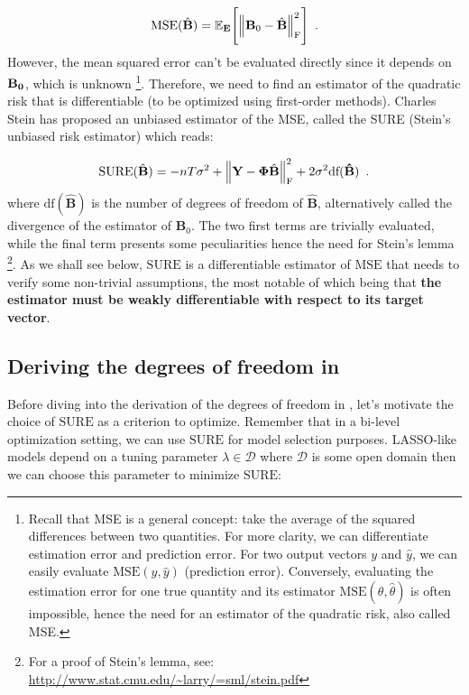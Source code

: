 \documentclass[a4paper,10pt]{article}
\theoremstyle{definition}
\begin{document}
\begin{equation*}
    \text{MSE}(\hat{\mathbf{B}}) = \mathbb{E}_{\mathbf{E}}\Biggl[ \left \lVert \mathbf{B}_0 - \hat{\mathbf{B}} \right \rVert_{\text{F}}^2 \Biggr]
    \enspace .
\end{equation*}
%
However, the mean squared error can't be evaluated directly since it depends on $\bf B_0$, which is unknown
%
\footnote{Recall that MSE is a general concept: take the average of the squared differences between two quantities.
For more clarity, we can differentiate estimation error and prediction error. For two output vectors $y$ and $\hat{y}$,
we can easily evaluate $\text{MSE}(y, \hat{y})$ (prediction error). Conversely, evaluating the estimation error for one
true quantity and its estimator $\text{MSE}(\theta, \hat{\theta})$ is often impossible, hence the need for
an estimator of the quadratic risk, also called MSE.}.
%
Therefore, we need to find an estimator of the quadratic risk that is differentiable (to be optimized using first-order methods). Charles Stein has
proposed an unbiased estimator of the MSE, called the SURE (Stein's unbiased risk estimator) which reads:

\begin{equation*}
    \text{SURE}(\hat{\bf{B}}) =
        -nT\sigma^2 + \left \lVert \mathbf{Y}
        - \mathbf{\Phi} \hat{\mathbf{B}} \right \rVert_{\text{F}}^2
        + 2 \sigma^2 \text{df}(\bf{\hat{B}})
    \enspace .
\end{equation*}
%
where $\text{df}(\mathbf{\hat{B}})$ is the number of degrees of freedom of $\hat{\mathbf{B}}$, alternatively called the divergence of
the estimator of $\mathbf{B}_0$. The two first terms are trivially evaluated, while the final term presents some
peculiarities hence the need for Stein's lemma
%
\footnote{For a proof of Stein's lemma, see:
\url{http://www.stat.cmu.edu/~larry/=sml/stein.pdf}}.
%
As we shall see below, $\text{SURE}$ is a differentiable estimator of $\text{MSE}$ that needs to verify some
non-trivial assumptions, the most notable of which being that \textbf{the estimator must be weakly differentiable with
respect to its target vector}.

\subsection*{Deriving the degrees of freedom in }

Before diving into the derivation of the degrees of freedom in , let's motivate the choice of $\text{SURE}$ as a criterion
to optimize. Remember that in a bi-level optimization setting, we can use $\text{SURE}$ for model selection purposes. LASSO-like
models depend on a tuning parameter $\lambda \in \mathcal{D}$ where $\mathcal{D}$ is some open domain then we can choose this parameter to
minimize $\text{SURE}$:
\end{document}
